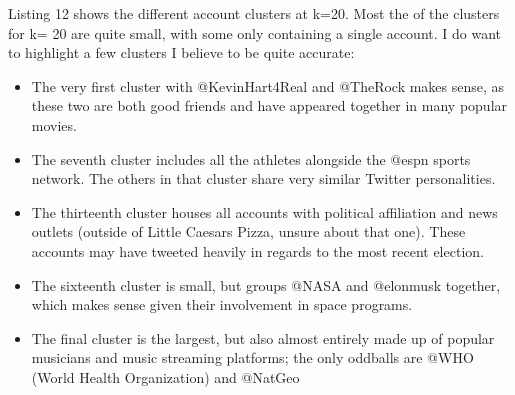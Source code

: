\documentclass[12pt]{article}
\begin{document}
Listing 12 shows the different account clusters at k=20. Most the of the clusters for k= 20 are quite small, with some only containing a single account. I do want to highlight a few clusters I believe to be quite accurate: 
\begin{itemize}
    \item The very first cluster with @KevinHart4Real and @TheRock makes sense, as these two are both good friends and have appeared together in many popular movies.
    \item The seventh cluster includes all the athletes alongside the @espn sports network. The others in that cluster share very similar Twitter personalities.  
    \item The thirteenth cluster houses all accounts with political affiliation and news outlets (outside of Little Caesars Pizza, unsure about that one). These accounts may have tweeted heavily in regards to the most recent election. 
    \item The sixteenth cluster is small, but groups @NASA and @elonmusk together, which makes sense given their involvement in space programs.
    \item The final cluster is the largest, but also almost entirely made up of popular musicians and music streaming platforms; the only oddballs are @WHO (World Health Organization) and @NatGeo 
    
\end{itemize}
\end{document}
